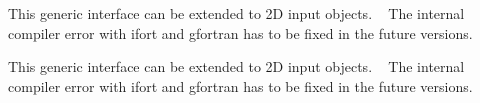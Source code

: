 
\begin{DoxyRefList}
\item[Type \mbox{\hyperlink{interfaceArrayReplace__mod_1_1genReplaced}{Array\+Replace\+\_\+mod\+::gen\+Replaced}} ]\label{todo__todo000001}%
%
 This generic interface can be extended to 2D input objects. ~\newline
 The internal compiler error with {\ttfamily ifort} and {\ttfamily gfortran} has to be fixed in the future versions. ~\newline
 
\item[Type \mbox{\hyperlink{interfaceArrayReplace__mod_1_1getReplaced}{Array\+Replace\+\_\+mod\+::get\+Replaced}} ]\label{todo__todo000002}%
%
 This generic interface can be extended to 2D input objects. ~\newline
 The internal compiler error with {\ttfamily ifort} and {\ttfamily gfortran} has to be fixed in the future versions. ~\newline
 

\end{DoxyRefList}
